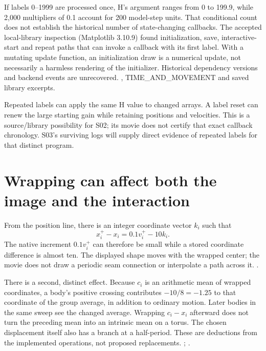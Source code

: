 If labels 0--1999 are processed once, H's argument ranges from 0 to
199.9, while 2,000 multipliers of 0.1 account for 200 model-step units.
That conditional count does not establish the historical number of
state-changing callbacks. The accepted local-library inspection
(Matplotlib 3.10.9) found initialization, save, interactive-start and
repeat paths that can invoke a callback with its first label. With
a mutating update function, an initialization draw is a numerical
update, not necessarily a harmless rendering of the initializer.
Historical dependency versions and backend events are unrecovered.
\cite{construction02}, TIME\_AND\_MOVEMENT and saved library excerpts.

Repeated labels can apply the same H value to changed arrays. A label
reset can renew the large starting gain while retaining positions and
velocities. This is a source/library possibility for S02; its movie
does not certify that exact callback chronology. S03's surviving logs
will supply direct evidence of repeated labels for that distinct
program. 

\section{Wrapping can affect both the image and the interaction}
From the position line, there is an integer coordinate vector $k_i$
such that
\begin{equation}\label{eq:seam}
x_i^+-x_i=0.1v_i^+-10k_i.
\end{equation}
The native increment $0.1v_i^+$ can therefore be small while a stored
coordinate difference is almost ten. The displayed shape moves with
the wrapped center; the movie does not draw a periodic seam connection
or interpolate a path across it. . 

There is a second, distinct effect. Because $c_i$ is an arithmetic mean
of wrapped coordinates, a body's positive crossing contributes
$-10/8=-1.25$ to that coordinate of the group average, in addition
to ordinary motion. Later bodies in the same sweep see the changed
average. Wrapping $c_i-x_i$ afterward does not turn the preceding mean
into an intrinsic mean on a torus. The chosen displacement itself
also has a branch at a half-period. These are deductions from the
implemented operations, not proposed replacements.
; \cite{construction02}. 


